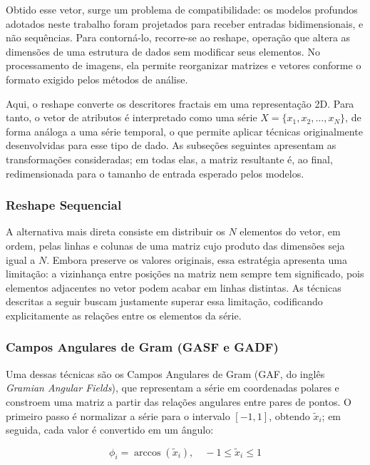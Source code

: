 Obtido esse vetor, surge um problema de compatibilidade: os modelos profundos adotados neste trabalho foram projetados para receber entradas bidimensionais, e não sequências. Para contorná-lo, recorre-se ao reshape, operação que altera as dimensões de uma estrutura de dados sem modificar seus elementos. No processamento de imagens, ela permite reorganizar matrizes e vetores conforme o formato exigido pelos métodos de análise.

Aqui, o reshape converte os descritores fractais em uma representação 2D. Para tanto, o vetor de atributos é interpretado como uma série $X = \{x_1, x_2, \dots, x_N\}$, de forma análoga a uma série temporal, o que permite aplicar técnicas originalmente desenvolvidas para esse tipo de dado. As subseções seguintes apresentam as transformações consideradas; em todas elas, a matriz resultante é, ao final, redimensionada para o tamanho de entrada esperado pelos modelos.

\subsubsection{Reshape Sequencial}
\hspace{+15pt}

A alternativa mais direta consiste em distribuir os $N$ elementos do vetor, em ordem, pelas linhas e colunas de uma matriz cujo produto das dimensões seja igual a $N$. Embora preserve os valores originais, essa estratégia apresenta uma limitação: a vizinhança entre posições na matriz nem sempre tem significado, pois elementos adjacentes no vetor podem acabar em linhas distintas. As técnicas descritas a seguir buscam justamente superar essa limitação, codificando explicitamente as relações entre os elementos da série.

\subsubsection{Campos Angulares de Gram (GASF e GADF)}
\hspace{+15pt}

Uma dessas técnicas são os Campos Angulares de Gram (GAF, do inglês \textit{Gramian Angular Fields}), que representam a série em coordenadas polares e constroem uma matriz a partir das relações angulares entre pares de pontos. %
O primeiro passo é normalizar a série para o intervalo $[-1, 1]$, obtendo $\tilde{x}_i$; em seguida, cada valor é convertido em um ângulo:

\begin{equation}
\phi_i = \arccos(\tilde{x}_i), \quad -1 \leq \tilde{x}_i \leq 1
\end{equation}

